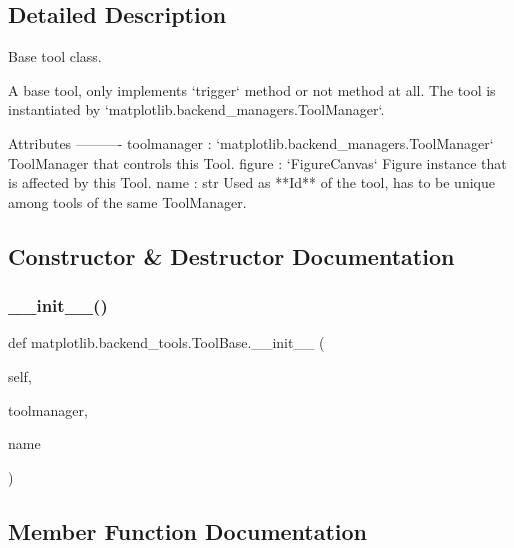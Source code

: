 \subsection{Detailed Description}
\begin{DoxyVerb}Base tool class.

A base tool, only implements `trigger` method or not method at all.
The tool is instantiated by `matplotlib.backend_managers.ToolManager`.

Attributes
----------
toolmanager : `matplotlib.backend_managers.ToolManager`
    ToolManager that controls this Tool.
figure : `FigureCanvas`
    Figure instance that is affected by this Tool.
name : str
    Used as **Id** of the tool, has to be unique among tools of the same
    ToolManager.
\end{DoxyVerb}
 

\subsection{Constructor \& Destructor Documentation}
\mbox{\label{classmatplotlib_1_1backend__tools_1_1ToolBase_ad220305a96c5635531913147ba548ca3}} 
\subsubsection{\texorpdfstring{\+\_\+\+\_\+init\+\_\+\+\_\+()}{\_\_init\_\_()}}
{\footnotesize\ttfamily def matplotlib.\+backend\+\_\+tools.\+Tool\+Base.\+\_\+\+\_\+init\+\_\+\+\_\+ (\begin{DoxyParamCaption}\item[{}]{self,  }\item[{}]{toolmanager,  }\item[{}]{name }\end{DoxyParamCaption})}



\subsection{Member Function Documentation}
\mbox{\label{classmatplotlib_1_1backend__tools_1_1ToolBase_ac96bf482f1c26012fec3fd575e849170}} 
